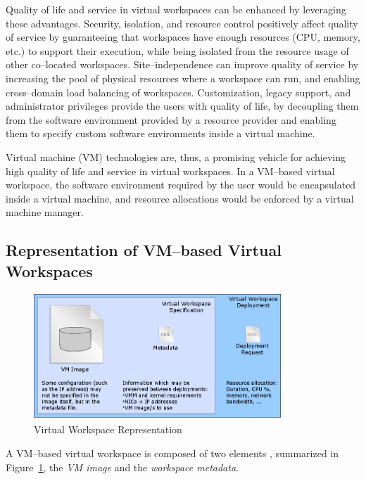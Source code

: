 Quality of life and service in virtual workspaces can be enhanced by leveraging these advantages. Security, isolation, and resource control positively affect quality of service by guaranteeing that workspaces have enough resources (CPU, memory, etc.) to support their execution, while being isolated from the resource usage of other co--located workspaces. Site--independence can improve quality of service by increasing the pool of physical resources where a workspace can run, and enabling cross--domain load balancing of workspaces. Customization, legacy support, and administrator privileges provide the users with quality of life, by decoupling them from the software environment provided by a resource provider and enabling them to specify custom software environments inside a virtual machine.

Virtual machine (VM) technologies  are, thus, a promising vehicle for achieving high quality of life and service in virtual workspaces. In a VM--based virtual workspace, the software environment required by the user would be encapsulated inside a virtual machine, and resource allocations would be enforced by a virtual machine manager.

\subsection{Representation of VM--based Virtual Workspaces}
\label{sec:vwrepresentation}

\begin{figure}
  \begin{center}
    \includegraphics[width=0.85\textwidth]{figures/vw_representation.png}
    \caption{Virtual Workspace Representation}
	\label{fig:vwrepresentation}
  \end{center}
\end{figure}


A VM--based virtual workspace is composed of two elements \cite{VirtualWorkspaces05}, summarized in Figure~\ref{fig:vwrepresentation}, the \emph{VM image} and the \emph{workspace metadata}.

